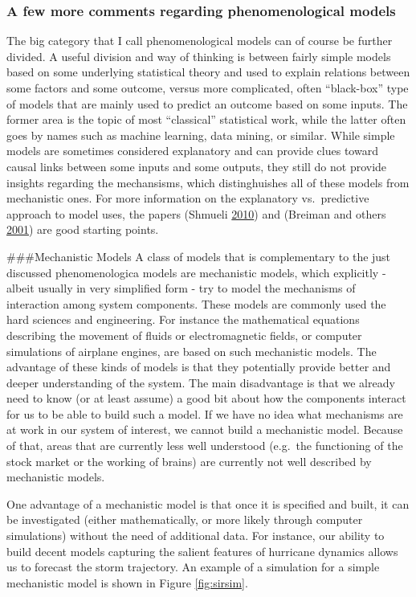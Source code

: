\documentclass[]{book}
\theoremstyle{definition}
\theoremstyle{definition}
\theoremstyle{definition}
\theoremstyle{remark}
\begin{document}
\hypertarget{mynotebox}{%
\subsubsection{A few more comments regarding phenomenological
models}\label{mynotebox}}

The big category that I call phenomenological models can of course be
further divided. A useful division and way of thinking is between fairly
simple models based on some underlying statistical theory and used to
explain relations between some factors and some outcome, versus more
complicated, often ``black-box'' type of models that are mainly used to
predict an outcome based on some inputs. The former area is the topic of
most ``classical'' statistical work, while the latter often goes by
names such as machine learning, data mining, or similar. While simple
models are sometimes considered explanatory and can provide clues toward
causal links between some inputs and some outputs, they still do not
provide insights regarding the mechansisms, which distinghuishes all of
these models from mechanistic ones. For more information on the
explanatory vs.~predictive approach to model uses, the papers (Shmueli
\protect\hyperlink{ref-shmueli10}{2010}) and (Breiman and others
\protect\hyperlink{ref-breiman01}{2001}) are good starting points.

\#\#\#Mechanistic Models A class of models that is complementary to the
just discussed phenomenologica models are mechanistic models, which
explicitly - albeit usually in very simplified form - try to model the
mechanisms of interaction among system components. These models are
commonly used the hard sciences and engineering. For instance the
mathematical equations describing the movement of fluids or
electromagnetic fields, or computer simulations of airplane engines, are
based on such mechanistic models. The advantage of these kinds of models
is that they potentially provide better and deeper understanding of the
system. The main disadvantage is that we already need to know (or at
least assume) a good bit about how the components interact for us to be
able to build such a model. If we have no idea what mechanisms are at
work in our system of interest, we cannot build a mechanistic model.
Because of that, areas that are currently less well understood (e.g.~the
functioning of the stock market or the working of brains) are currently
not well described by mechanistic models.

One advantage of a mechanistic model is that once it is specified and
built, it can be investigated (either mathematically, or more likely
through computer simulations) without the need of additional data. For
instance, our ability to build decent models capturing the salient
features of hurricane dynamics allows us to forecast the storm
trajectory. An example of a simulation for a simple mechanistic model is
shown in Figure \ref{fig:sirsim}.
\end{document}
